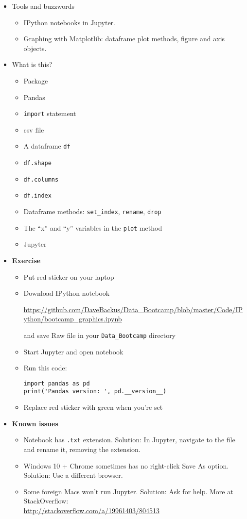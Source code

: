 \documentclass[11pt]{article}
\begin{document}
\begin{itemize}
\item Tools and buzzwords
\begin{itemize}
\item IPython notebooks in Jupyter.
\item Graphing with Matplotlib: dataframe plot methods, figure and axis objects.
\end{itemize}

\item What is this?
\begin{itemize}
\item Package
\item Pandas
\item {\tt import} statement
\item csv file
\item A dataframe {\tt df}
\item {\tt df.shape}
\item {\tt df.columns}
\item {\tt df.index}
\item Dataframe methods:  \verb|set_index|, {\tt rename}, {\tt drop}
\item The ``x'' and ``y'' variables in the {\tt plot} method
\item Jupyter
\end{itemize}

\item {\bf Exercise}
\begin{itemize}
\item Put red sticker on your laptop

\item Download IPython notebook

\url{https://github.com/DaveBackus/Data_Bootcamp/blob/master/Code/IPython/bootcamp_graphics.ipynb}

and save Raw file in your \verb|Data_Bootcamp| directory
\item Start Jupyter and open notebook
\item Run this code:
\begin{verbatim}
import pandas as pd
print('Pandas version: ', pd.__version__)
\end{verbatim}
\item Replace red sticker with green when you're set
\end{itemize}

\item {\bf Known issues}
\begin{itemize}
\item Notebook has {\tt .txt} extension.  Solution:  In Jupyter, navigate to the file
and rename it, removing the extension.
\item Windows 10 + Chrome sometimes has no right-click Save As option.
Solution:  Use a different browser.
\item Some foreign Macs won't run Jupyter.  Solution:  Ask for help. More at StackOverflow: \\
\url{http://stackoverflow.com/a/19961403/804513}

\end{itemize}
\end{itemize}
\end{document}
